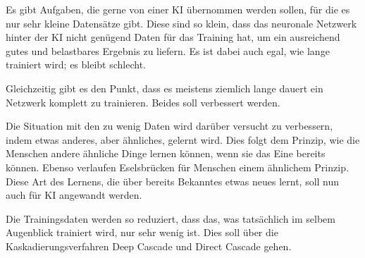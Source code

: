 Es gibt Aufgaben, die gerne von einer KI übernommen werden sollen, für die es nur sehr kleine Datensätze gibt. Diese sind so klein, dass das 
neuronale Netzwerk hinter der KI nicht genügend Daten für das Training hat, um ein ausreichend gutes und belastbares Ergebnis zu liefern. 
Es ist dabei auch egal, wie lange trainiert wird; es bleibt schlecht. 

Gleichzeitig gibt es den Punkt, dass es meistens ziemlich lange dauert ein Netzwerk komplett zu trainieren. Beides soll verbessert werden. 

Die Situation mit den zu wenig Daten wird darüber versucht zu verbessern, indem etwas anderes, aber ähnliches, gelernt wird. Dies folgt dem 
Prinzip, wie die Menschen andere ähnliche Dinge lernen können, wenn sie das Eine bereits können. Ebenso verlaufen Eselsbrücken für Menschen 
einem ähnlichem Prinzip. Diese Art des Lernens, die über bereits Bekanntes etwas neues lernt, soll nun auch für KI angewandt werden. 

Die Trainingsdaten werden so reduziert, dass das, was tatsächlich im selbem Augenblick trainiert wird, nur sehr wenig ist. Dies soll über die 
Kaskadierungsverfahren Deep Cascade und Direct Cascade gehen. 
